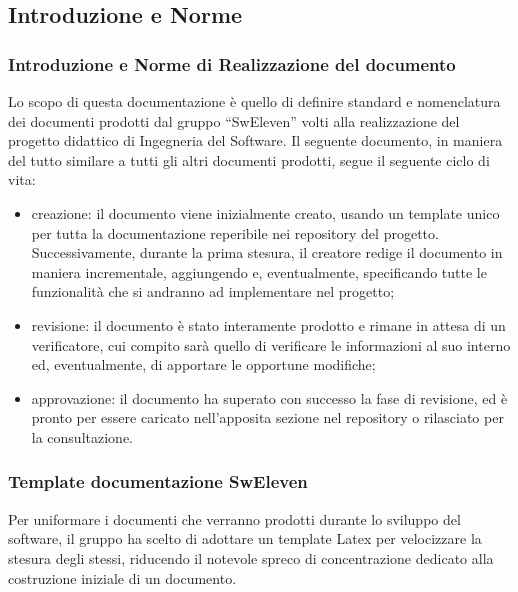 \subsection{Introduzione e Norme}
\subsubsection{Introduzione e Norme di Realizzazione del documento}
Lo scopo di questa documentazione è quello di definire standard e nomenclatura dei documenti prodotti dal gruppo “SwEleven” volti alla realizzazione del progetto didattico di Ingegneria del Software.
Il seguente documento, in maniera del tutto similare a tutti gli altri documenti prodotti, segue il seguente ciclo di vita:
\begin{itemize}
\item creazione: il documento viene inizialmente creato, usando un template unico per tutta la documentazione reperibile nei repository del progetto. Successivamente, durante la prima stesura, il creatore redige il documento in maniera incrementale, aggiungendo e, eventualmente, specificando tutte le funzionalità che si andranno ad implementare nel progetto;
\item revisione: il documento è stato interamente prodotto e rimane in attesa di un verificatore, cui compito sarà quello di verificare le informazioni al suo interno ed, eventualmente, di apportare le opportune modifiche;
\item approvazione: il documento ha superato con successo la fase di revisione, ed è pronto per essere caricato nell’apposita sezione nel repository o rilasciato per la consultazione.
\end{itemize}
\subsubsection{Template documentazione SwEleven}
Per uniformare i documenti che verranno prodotti durante lo sviluppo del software, il gruppo ha scelto di adottare un template Latex per velocizzare la stesura degli stessi, riducendo il notevole spreco di concentrazione dedicato alla costruzione iniziale di un documento.